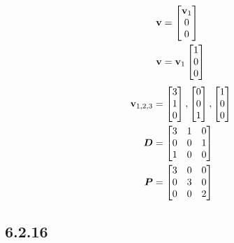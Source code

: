 \documentclass{article}
\begin{document}
\begin{align*}
	\vect{v} & =
		\begin{bmatrix} \vect{v}_1 \\ 0 \\ 0 \end{bmatrix} \\
	\vect{v} & =
		\vect{v}_1 \begin{bmatrix} 1 \\ 0 \\ 0 \end{bmatrix}
\end{align*}
\begin{align*}
	\vect{v}_{1,2,3} & =
		\begin{bmatrix} 3 \\ 1 \\ 0 \end{bmatrix},
		\begin{bmatrix} 0 \\ 0 \\ 1 \end{bmatrix},
		\begin{bmatrix} 1 \\ 0 \\ 0 \end{bmatrix} \\
	\matr{D} & =
		\begin{bmatrix}
			3 & 1 & 0 \\
			0 & 0 & 1 \\
			1 & 0 & 0
		\end{bmatrix} \\
	\matr{P} & =
		\begin{bmatrix}
			3 & 0 & 0 \\
			0 & 3 & 0 \\
			0 & 0 & 2
		\end{bmatrix}
\end{align*}

\subsection{6.2.16}
\end{document}

